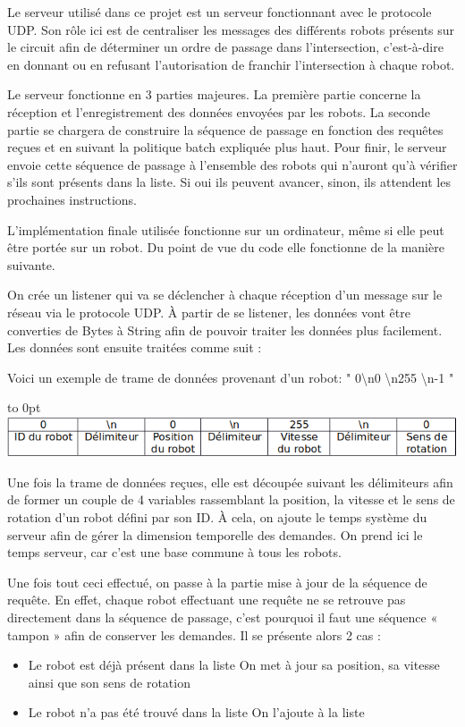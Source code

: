 \documentclass[french,a4paper,12pt]{report}
\begin{document}
Le serveur utilisé dans ce projet est un serveur fonctionnant avec le protocole UDP. Son rôle ici est de centraliser les messages des différents robots présents sur le circuit afin de déterminer un ordre de passage dans l’intersection, c’est-à-dire en donnant ou en refusant l’autorisation de franchir l’intersection à chaque robot.

Le serveur fonctionne en 3 parties majeures. La première partie concerne la réception et l’enregistrement des données envoyées par les robots. La seconde partie se chargera de construire la séquence de passage en fonction des requêtes reçues et en suivant la politique batch expliquée plus haut. Pour finir, le serveur envoie cette séquence de passage à l’ensemble des robots qui n’auront qu’à vérifier s’ils sont présents dans la liste. Si oui ils peuvent avancer, sinon, ils attendent les prochaines instructions.

L’implémentation finale utilisée fonctionne sur un ordinateur, même si elle peut être portée sur un robot. Du point de vue du code elle fonctionne de la manière suivante.

On crée un listener qui va se déclencher à chaque réception d’un message sur le réseau via le protocole UDP. À partir de se listener, les données vont être converties de Bytes à String afin de pouvoir traiter les données plus facilement. Les données sont ensuite traitées comme suit :

Voici un exemple de trame de données provenant d’un robot: " 0\textbackslash n0 \textbackslash n255 \textbackslash n-1 " \newline

\hfill\hbox to 0pt{\hss\includegraphics[width=15cm]{val.png}\hss}\hfill\null\newline

Une fois la trame de données reçues, elle est découpée suivant les délimiteurs afin de former un couple de 4 variables rassemblant la position, la vitesse et le sens de rotation d’un robot défini par son ID. À cela, on ajoute le temps système du serveur afin de gérer la dimension temporelle des demandes. On prend ici le temps serveur, car c’est une base commune à tous les robots.

Une fois tout ceci effectué, on passe à la partie mise à jour de la séquence de requête. En effet, chaque robot effectuant une requête ne se retrouve pas directement dans la séquence de passage, c’est pourquoi il faut une séquence « tampon » afin de conserver les demandes. Il se présente alors 2 cas :
\begin{itemize}
\item Le robot est déjà présent dans la liste
	On met à jour sa position, sa vitesse ainsi que son sens de rotation
	
\item Le robot n’a pas été trouvé dans la liste
	On l’ajoute à la liste
\end{itemize}
\end{document}
